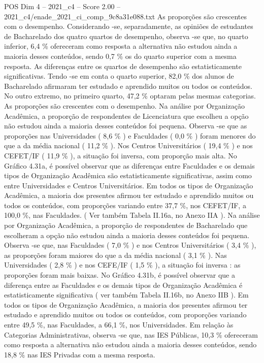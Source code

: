 \begin{textsample}{POS Dim 4 – 2021\_c4 – Score 2.00 – 2021\_c4/enade\_2021\_ci\_comp\_9c8a31e088.txt}
As proporções são crescentes com o desempenho.
Considerando -se, separadamente, as opiniões de estudantes de Bacharelado dos quatro quartos de desempenho, observa -se que, no quarto inferior, 6,4 \% ofereceram como resposta a alternativa não estudou ainda a maioria desses conteúdos, sendo 0,7 \% os do quarto superior com a mesma resposta.
As diferenças entre os quartos de desempenho são estatisticamente significativas.
Tendo -se em conta o quarto superior, 82,0 \% dos alunos de Bacharelado afirmaram ter estudado e aprendido muitos ou todos os conteúdos.
No outro extremo, no primeiro quarto, 47,2 \% optaram pelas mesmas categorias.
As proporções são crescentes com o desempenho.
Na análise por Organização Acadêmica, a proporção de respondentes de Licenciatura que escolheu a opção não estudou ainda a maioria desses conteúdos foi pequena.
Observa -se que as proporções nas Universidades ( 8,6 \% ) e Faculdades ( 0,0 \% ) foram menores do que a da média nacional ( 11,2 \% ).
Nos Centros Universitários ( 19,4 \% ) e nos CEFET/IF ( 11,9 \% ), a situação foi inversa, com proporção mais alta.
No Gráfico 4.31a, é possível observar que as diferenças entre Faculdades e os demais tipos de Organização Acadêmica são estatisticamente significativas, assim como entre Universidades e Centros Universitários.
Em todos os tipos de Organização Acadêmica, a maioria dos presentes afirmou ter estudado e aprendido muitos ou todos os conteúdos, com proporções variando entre 37,7 \%, nos CEFET/IF, a 100,0 \%, nas Faculdades. ( Ver também Tabela II.16a, no Anexo IIA ).
Na análise por Organização Acadêmica, a proporção de respondentes de Bacharelado que escolheram a opção não estudou ainda a maioria desses conteúdos foi pequena.
Observa -se que, nas Faculdades ( 7,0 \% ) e nos Centros Universitários ( 3,4 \% ), as proporções foram maiores do que a da média nacional ( 3,1 \% ).
Nas Universidades ( 2,8 \% ) e nos CEFE/IF ( 1,5 \% ), a situação foi inversa : as proporções foram mais baixas.
No Gráfico 4.31b, é possível observar que a diferença entre as Faculdades e os demais tipos de Organização Acadêmica é estatisticamente significativa ( ver também Tabela II.16b, no Anexo IIB ).
Em todos os tipos de Organização Acadêmica, a maioria dos presentes afirmou ter estudado e aprendido muitos ou todos os conteúdos, com proporções variando entre 49,5 \%, nas Faculdades, a 66,1 \%, nos Universidades.
Em relação às Categorias Administrativas, observa -se que, nas IES Públicas, 10,3 \% ofereceram como resposta a alternativa não estudou ainda a maioria desses conteúdos, sendo 18,8 \% nas IES Privadas com a mesma resposta.

\end{textsample}
